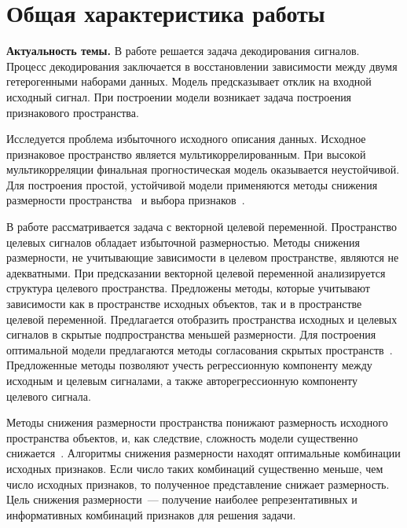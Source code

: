 \documentclass[11pt, a5paper]{dissert}
\begin{document}
\clearpage




\section*{Общая характеристика работы}
\label{ch:Intro}

\textbf{Актуальность темы.} 
В работе решается задача декодирования сигналов. 
Процесс декодирования заключается в восстановлении зависимости между двумя гетерогенными наборами данных.
Модель предсказывает отклик на входной исходный сигнал.
При построении модели возникает задача построения признакового пространства. 

Исследуется проблема избыточного исходного описания данных. 
Исходное признаковое пространство является мультикоррелированным.
При высокой мультикорреляции финальная прогностическая модель оказывается неустойчивой.
Для построения простой, устойчивой модели применяются методы снижения размерности пространства~\cite{motrenko2018multi,chun2010sparse,mehmood2012review}  и выбора признаков~\cite{katrutsa2017comprehensive,li2017feature}.

В работе рассматривается задача с векторной целевой переменной. 
Пространство целевых сигналов обладает избыточной размерностью. 
Методы снижения размерности, не учитывающие зависимости в целевом пространстве, являются не адекватными.
При предсказании векторной целевой переменной анализируется структура целевого пространства.
Предложены методы, которые учитывают зависимости как в пространстве исходных объектов, так и в пространстве целевой переменной.
Предлагается отобразить пространства исходных и целевых сигналов в скрытые подпространства меньшей размерности.
Для построения оптимальной модели предлагаются методы согласования скрытых пространств~\cite{wold1975path,rosipal2005overview,eliseyev2017recursive}.
Предложенные методы позволяют учесть регрессионную компоненту между исходным и целевым сигналами, а также авторегрессионную компоненту целевого сигнала.

Методы снижения размерности пространства понижают размерность исходного пространства объектов, и, как следствие, сложность модели существенно снижается~\cite{tipping1999probabilisticpca,wold1975path,hotelling1992relations}. 
Алгоритмы снижения размерности находят оптимальные комбинации исходных признаков. 
Если число таких комбинаций существенно меньше, чем число исходных признаков, то полученное представление снижает размерность.
Цель снижения размерности~--- получение наиболее репрезентативных и информативных комбинаций признаков для решения задачи.
\end{document}
